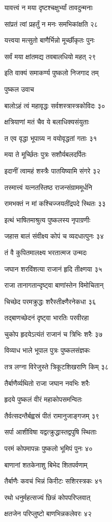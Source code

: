यावत्त्वं न मया दृष्टश्चक्षुर्भ्यां तावदुन्मनाः

सांप्रतं त्वां प्रहर्तुं न मनः समभिकांक्षति २८

यत्त्वया मत्सुतो बाणैर्भिन्नो मूर्च्छीकृतः पुनः

सर्वं मया क्षांतमद्य तवबालधियो महत् २९

इति वाक्यं समाकर्ण्य पुष्कलो निजगाद तम्

पुष्कल उवाच

बालोऽहं त्वं महावृद्धः सर्वशस्त्रास्त्रकोविदः ३०

क्षत्रियाणां मतं चैव ये बलाधिक्यसंयुताः

त एव वृद्धा भूपाग्र्य न वयोवृद्धतां गताः ३१

मया ते मूर्च्छितः पुत्रः सशौर्यबलदर्पितः

इदानीं त्वामहं शस्त्रैः पातयिष्यामि संगरे ३२

तस्मात्त्वं यत्नतस्तिष्ठ राजन्संग्राममूर्धनि

रामभक्तं न मां कश्चिज्जयतींद्रपदे स्थितः ३३

इत्थं भाषितमाश्रुत्य पुष्कलस्य नृपाग्रणीः

जहास बालं संवीक्ष्य कोपं च व्यदधात्पुनः ३४

तं वै कुपितमालक्ष्य भरतात्मज उन्मदः

जघान शरविंशत्या राजानं हृदि तीक्ष्णया ३५

राजा तानागतान्दृष्ट्वा बाणांस्तेन विमोचितान्

चिच्छेद परमक्रुद्धः शरैस्तीक्ष्णैरनेकधा ३६

तद्बाणच्छेदनं दृष्ट्वा भारतिः परवीरहा

चुकोप हृदयेऽत्यंतं राजानं च त्रिभिः शरैः ३७

विव्याध भाले भूपाल पुत्रः पुष्कलसंज्ञकः

तत्र लग्ना विरेजुस्ते त्रिकूटशिखराणि किम् ३८

तैर्बाणैर्व्यथितो राजा जघान नवभिः शरैः

हृदये पुष्कलं वीरं महाकोपसमन्वितः

तैर्वत्सदन्तैर्बह्वस्रं पीतं रामानुजाङ्गजम् ३९

सर्पा आशीविषा यद्वत्क्रुद्धास्तद्वपुषि स्थिताः

परमं कोपमापन्नः पुष्कलो भूमिपं पुनः ४०

बाणानां शतकेनाशु बिभेद शितपर्वणाम्

तैर्बाणैः कवचं भिन्नं किरीटः सशिरस्त्रकः ४१

रथो धनुर्महत्सज्यं छिन्नं कोपपरिप्लवात्

क्षतजेन परिप्लुष्टो बाणभिन्नकलेवरः ४२

